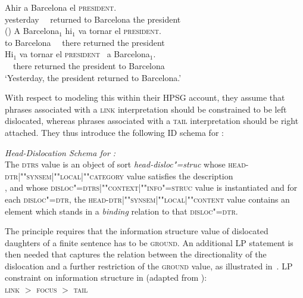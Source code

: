 \documentclass[output=paper,biblatex,babelshorthands,newtxmath,draftmode,colorlinks,citecolor=brown]{langscibook}
\begin{document}
\begin{exe}
  \ex\label{ex:catalan}
  \begin{xlist}
    \ex\gll Ahir  a Barcelona el \textsc{president}\RF.\\
         yesterday \ \ returned to Barcelona the president\\\hfill()
   \ex\gll  A Barcelona$_1$ \LF hi$_1$ {va tornar} el \textsc{president}\RF.\\
           to Barcelona \ \  there returned the president\\\label{ex:catalan-a}
           \ex\gll \LF Hi$_1$ {va tornar} el \textsc{president}\RF\ {} a Barcelona$_1$.\\
            \ \  there  returned the president to Barcelona\\\label{ex:catalan-b}
\trans `Yesterday, the president returned to Barcelona.'
  \end{xlist}
\end{exe}
 
\noindent
With respect to modeling this within their HPSG account, they assume
that phrases associated with a \textsc{link} interpretation should be
constrained to be left dislocated, whereas phrases associated with a
\textsc{tail} interpretation should be right attached.
They thus introduce the following ID schema for :
\begin{sloppy}
\begin{exe}
\ex  \textit{Head-Dislocation Schema for :}\\
  The \textsc{dtrs} value is an object of sort
  \textit{head-disloc"=struc} whose
  \textsc{head-dtr|""syn\-sem|""local|""category} value satisfies the
  description\\
  , and whose
  \textsc{disloc"=dtrs|""context|""info"=struc} value is instantiated and
  for each \textsc{disloc"=dtr}, the
  \textsc{head-dtr|""synsem|""local|""content} value contains an element
  which stands in a \textit{binding} relation to that
  \textsc{disloc"=dtr}.
\end{exe}
\end{sloppy}

\largerpage
\noindent
The principle requires that the information structure value of
dislocated daughters of a finite sentence has to be
\textsc{ground}. An additional LP statement is then needed that captures the relation
between the directionality of the dislocation and a further
restriction of the \textsc{ground} value, as illustrated in~.
\ea
LP constraint on information structure in  (adapted from \citealp[]{EV96a}):\\
  \centering
  \textsc{link} $>$ \textsc{focus} $>$ \textsc{tail}
\end{document}
